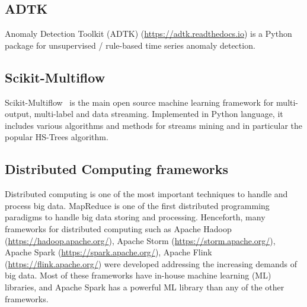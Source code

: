 
\subsection{ADTK}
Anomaly Detection Toolkit (ADTK) (\href{https://adtk.readthedocs.io}{https://adtk.readthedocs.io})
is a Python package for unsupervised / rule-based time series anomaly detection.

\subsection{Scikit-Multiflow}
Scikit-Multiflow~\cite{montiel2018scikit}
is the main open source machine learning framework
for multi-output,
multi-label and data streaming.
Implemented in Python language,
it includes various algorithms and
methods for streams mining and in
particular the popular HS-Trees algorithm.

\subsection{Distributed Computing frameworks}
Distributed computing is one of the most
important techniques to handle
and process big data.
MapReduce is one
of the first distributed programming paradigms to
handle big data storing and processing.
Henceforth,
many frameworks for distributed computing
such as Apache Hadoop
(\href{https://hadoop.apache.org/}{https://hadoop.apache.org/}),
Apache Storm
(\href{https://storm.apache.org/}{https://storm.apache.org/}),
Apache Spark
(\href{https://spark.apache.org/}{https://spark.apache.org/}),
Apache Flink
(\href{https://flink.apache.org/}{https://flink.apache.org/})
were developed addressing the increasing demands of big data.
Most of these frameworks
have in-house machine learning (ML) libraries,
and Apache Spark has a powerful
ML library than any of the other frameworks.



